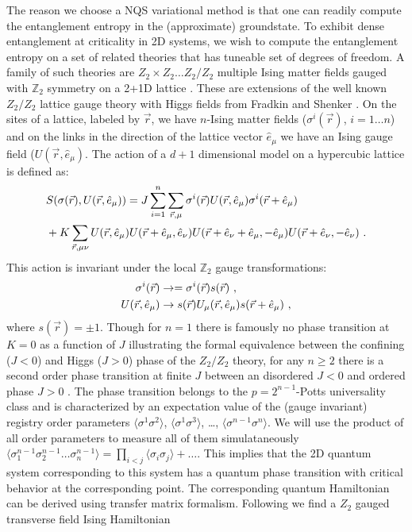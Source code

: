 The reason we choose a NQS variational method is that one can readily compute the entanglement entropy in the (approximate) groundstate.
To exhibit dense entanglement at criticality in 2D systems, we wish to compute the entanglement entropy on a set of related theories that has tuneable set of degrees of freedom. A family of such theories are $Z_2\times Z_2 \ldots Z_2/Z_2$ multiple Ising matter fields gauged with $\mathbb{Z}_2$ symmetry on a 2+1D lattice \cite{Bukva:Registry}. These are extensions of the well known $Z_2/Z_2$ lattice gauge theory with Higgs fields from Fradkin and Shenker \cite{fradkinPhaseDiagramsLattice1979}. On the sites of a lattice, labeled by $\vec{r}$, we have $n$-Ising matter fields ($\sigma^i(\vec{r})$, $i=1\ldots n$) and on the links in the direction of the lattice vector $\hat{e}_\mu$ we have an Ising gauge field ($U(\vec{r},\hat{e}_{\mu})$. The action of a $d+1$ dimensional model on a hypercubic lattice is defined as:
	\begin{equation}
		\begin{split}
			&S(\sigma(\vec{r}), U(\vec{r},\hat{e}_{\mu})) =
			J \sum_{i=1}^n\sum_{\vec{r}, \mu} \sigma^i(\vec{r}) U(\vec{r},\hat{e}_{\mu}) \sigma^i(\vec{r} + \hat{e}_\mu)  \\ &+ K \sum_{\vec{r}, \mu \nu} 
			U(\vec{r},\hat{e}_{\mu}) U(\vec{r} + \hat{e}_\mu,\hat{e}_{\nu}) U(\vec{r}+\hat{e}_{\nu}+\hat{e}_{\mu},-\hat{e}_{\mu}) U(\vec{r}+\hat{e}_{\nu},-\hat{e}_{\nu}) \ .
		\end{split}
	\end{equation}
	This action is invariant under the local $\mathbb{Z}_2$ gauge transformations:
	\begin{equation}
		\begin{split}
			\sigma^i(\vec{r}) &\rightarrow 
			= \sigma^i(\vec{r}) s(\vec{r}) \ , \\
			U(\vec{r},\hat{e}_{\mu}) &\rightarrow s(\vec{r})U_\mu(\vec{r},\hat{e}_{\mu})s(\vec{r} + \hat{e}_\mu) \ ,
		\end{split}		
	\end{equation}
	where $s(\vec{r}) = \pm 1$. Though for $n=1$ there is famously no phase transition at $K=0$ as a function of $J$ illustrating the formal equivalence between the confining ($J<0$) and Higgs ($J>0$) phase of the $Z_2/Z_2$ theory, for any $n \geq 2$ there is a second order phase transition at finite $J$ between an disordered $J<0$ and ordered phase $J>0$ \cite{Bukva:Registry}. The phase transition belongs to the $p=2^{n-1}$-Potts universality class and is characterized by an expectation value of the (gauge invariant) registry order parameters $\langle \sigma^1\sigma^2\rangle$,  $\langle \sigma^1\sigma^3\rangle$, \ldots, $\langle \sigma^{n-1}\sigma^n\rangle$. We will use the product of all order parameters to measure all of them simulataneously $\langle \sigma_1^{n-1}\sigma_{2}^{n-1}\ldots \sigma_n^{n-1}\rangle =\prod_{i<j}\langle \sigma_i\sigma_j\rangle +\ldots $. This implies that the 2D quantum system corresponding to this system has a quantum phase transition with critical behavior at the corresponding point. The corresponding quantum Hamiltonian can be derived using transfer matrix formalism. Following \cite{transferMatrix1978,RevModPhys.51.659} we find a $Z_2$ gauged transverse field Ising Hamiltonian 
